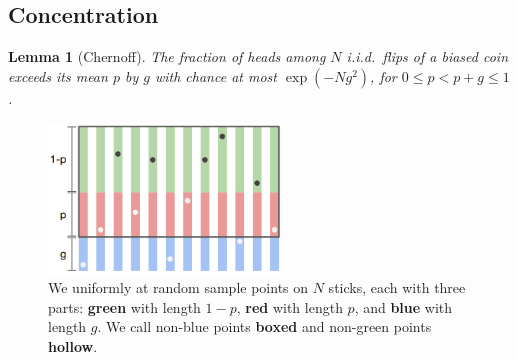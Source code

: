 \documentclass[twocolumn, 11pt]{article}
\newtheorem*{lem}{Lemma}
\theoremstyle{definition}
\newcommand{\msec}[1]{\subsection*{\color{mblu}\textsf{#1}}}
\begin{document}
    \msec{Concentration}

        \begin{lem}[Chernoff]
            The fraction of heads among $N$ i.i.d.\ flips of a biased coin
            exceeds its mean $p$ by $g$ with chance at most 
            $\exp(-Ng^2)$, for $0 \leq p < p+g \leq 1$.
        \end{lem}

        \begin{figure}[H]
            \centering
            \includegraphics[height=4cm, clip]{chernoff}
            \caption{{
                We uniformly at random sample points on $N$
                sticks, each with three parts: \textbf{green}
                with length $1-p$, \textbf{red} with length $p$, and
                \textbf{blue} with length $g$.  We call non-blue points
                \textbf{boxed} and non-green points \textbf{hollow}.
            }}
            \label{fig:chernoff}
        \end{figure}
\end{document}
